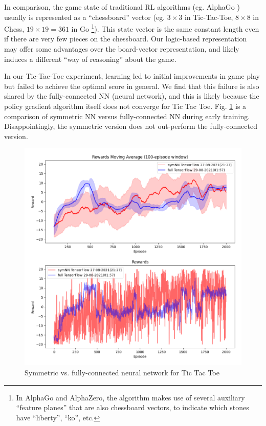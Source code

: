 \documentclass[orivec]{llncs}
\begin{document}
In comparison, the game state of traditional RL algorithms (eg. AlphaGo \cite{Silver2016} \cite{Silver2017} \cite{Pumperla2019}) usually is represented as a ``chessboard'' vector (eg. $3 \times 3$ in Tic-Tac-Toe, $8 \times 8$ in Chess, $19 \times 19 = 361$ in Go \footnote{In AlphaGo and AlphaZero, the algorithm makes use of several auxiliary ``feature planes'' that are also chessboard vectors, to indicate which stones have ``liberty'', ``ko'', etc.}).  This state vector is the same constant length even if there are very few pieces on the chessboard.  Our logic-based representation may offer some advantages over the board-vector representation, and likely induces a different ``way of reasoning'' about the game.

In our Tic-Tac-Toe experiment, learning led to initial improvements in game play but failed to achieve the optimal score in general.  We find that this failure is also shared by the fully-connected NN (neural network), and this is likely because the policy gradient algorithm itself does not converge for Tic Tac Toe.  Fig. \ref{fig:comparison} is a comparison of symmetric NN versus fully-connected NN during early training.  Disappointingly, the symmetric version does not out-perform the fully-connected version.

\begin{figure}[h]
\centering
\includegraphics[scale=0.5]{comparison.png}
\caption{Symmetric vs. fully-connected neural network for Tic Tac Toe}
\label{fig:comparison}
\end{figure}
\end{document}
